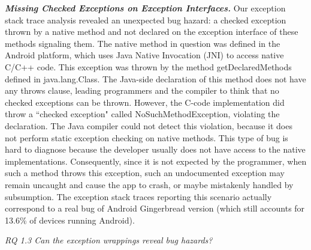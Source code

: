 \emph{\textbf{Missing Checked Exceptions on Exception Interfaces.}} 
Our exception stack trace analysis revealed an unexpected bug hazard: a 
checked exception thrown by a native method and not declared on the exception 
interface of these methods signaling them. The native method in question was defined in
 the Android platform, which uses Java Native Invocation (JNI) to access 
native C/C++ code. This exception was thrown by the method getDeclaredMethods defined in java.lang.Class. 
The Java-side declaration of this method does not have any throws clause, 
leading programmers and the compiler to think that no checked exceptions can be thrown.
 However, the C-code implementation did throw a ``checked exception" called NoSuchMethodException, 
violating the declaration. The Java compiler could not detect this violation, because it does 
not perform static exception checking on native methods. This type of bug is hard to diagnose
because the developer usually does not have access to the native implementations. 
Consequently, since it is not expected by the programmer, when such a method throws 
this exception, such an undocumented exception may remain
uncaught and cause the app to crash, or maybe mistakenly handled by subsumption.
The exception stack traces reporting this scenario actually correspond
to a real bug of Android 
Gingerbread version (which still accounts for 13.6\% of devices running Android).

\bigskip


\bigskip

\noindent\emph{RQ 1.3 Can the exception wrappings reveal bug hazards?}

\bigskip

